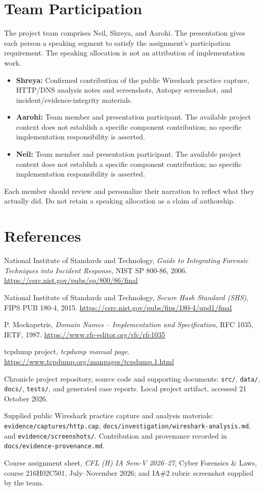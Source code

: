 \documentclass[12pt,a4paper]{report}
\begin{document}
\chapter{Team Participation}
The project team comprises Neil, Shreya, and Aarohi. The presentation gives each person a speaking segment to satisfy the assignment's participation requirement. The speaking allocation is not an attribution of implementation work.
\begin{itemize}
\item \textbf{Shreya:} Confirmed contribution of the public Wireshark practice capture, HTTP/DNS analysis notes and screenshots, Autopsy screenshot, and incident/evidence-integrity materials.
\item \textbf{Aarohi:} Team member and presentation participant. The available project context does not establish a specific component contribution; no specific implementation responsibility is asserted.
\item \textbf{Neil:} Team member and presentation participant. The available project context does not establish a specific component contribution; no specific implementation responsibility is asserted.
\end{itemize}
Each member should review and personalize their narration to reflect what they actually did. Do not retain a speaking allocation as a claim of authorship.

\chapter{References}
\begin{enumerate}[label={[}\arabic*{]}]
\item National Institute of Standards and Technology, \emph{Guide to Integrating Forensic Techniques into Incident Response}, NIST SP 800-86, 2006. \url{https://csrc.nist.gov/pubs/sp/800/86/final}
\item National Institute of Standards and Technology, \emph{Secure Hash Standard (SHS)}, FIPS PUB 180-4, 2015. \url{https://csrc.nist.gov/pubs/fips/180-4/upd1/final}
\item P. Mockapetris, \emph{Domain Names -- Implementation and Specification}, RFC 1035, IETF, 1987. \url{https://www.rfc-editor.org/rfc/rfc1035}
\item tcpdump project, \emph{tcpdump manual page}. \url{https://www.tcpdump.org/manpages/tcpdump.1.html}
\item Chronicle project repository, source code and supporting documents: \texttt{src/}, \texttt{data/}, \texttt{docs/}, \texttt{tests/}, and generated case reports. Local project artifact, accessed 21 October 2026.
\item Supplied public Wireshark practice capture and analysis materials: \texttt{evidence/captures/http.cap}, \texttt{docs/investigation/wireshark-analysis.md}, and \texttt{evidence/screenshots/}. Contribution and provenance recorded in \texttt{docs/evidence-provenance.md}.
\item Course assignment sheet, \emph{CFL (H) IA Sem-V 2026--27}, Cyber Forensics \& Laws, course 216H02C501, July--November 2026; and IA\#2 rubric screenshot supplied by the team.
\end{enumerate}
\end{document}
